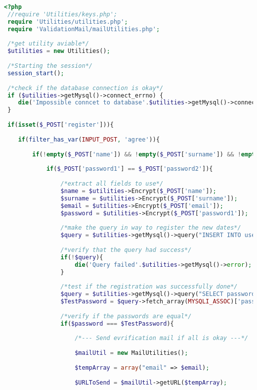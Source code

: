  \begin{lstlisting}[language=php]
 <?php
 //require 'Utilities/keys.php';
 require 'Utilities/utilities.php';
 require 'ValidationMail/mailUtilities.php';
 
 /*get utility aviable*/
 $utilities = new Utilities();
 
 /*Starting the session*/
 session_start();
 
 /*check if the database connection is okay*/
 if ($utilities->getMysql()->connect_errno) {
 	die('Impossible conncet to database'.$utilities->getMysql()->connect_error);
 }
 
 if(isset($_POST['register'])){
 	
 	if(filter_has_var(INPUT_POST, 'agree')){
 		
 		if(!empty($_POST['name']) && !empty($_POST['surname']) && !empty($_POST['email']) && !empty($_POST['password1']) && !empty($_POST['password2'])){
 			
 			if($_POST['password1'] == $_POST['password2']){
 				
 				/*extract all fields to use*/
 				$name = $utilities->Encrypt($_POST['name']);
 				$surname = $utilities->Encrypt($_POST['surname']);
 				$email = $utilities->Encrypt($_POST['email']);
 				$password = $utilities->Encrypt($_POST['password1']);
 				
 				/*make the query in way to register the new dates*/
 				$query = $utilities->getMysql()->query("INSERT INTO user_table1 (name, surname, email, password) VALUES ('{$name}', '{$surname}', '{$email}', '{$password}')");
 				
 				/*verify that the query had success*/
 				if(!$query){
 					die('Query failed'.$utilities->getMysql()->error);
 				}
 				
 				/*test if the registration was successfully done*/
 				$query = $utilities->getMysql()->query("SELECT password FROM user_table1 WHERE (email = '{$email}')");
 				$TestPassword = $query->fetch_array(MYSQLI_ASSOC)['password'];
 				
 				/*verify if the passwords are equal*/
 				if($password === $TestPassword){
 					
 					/*--- Send evrification mail if all is okay ---*/
 					
 					$mailUtil = new MailUtilities();
 					
 					$tempArray = array("email" => $email);
 					
 					$URLToSend = $mailUtil->getURL($tempArray);
 					

\end{lstlisting}
